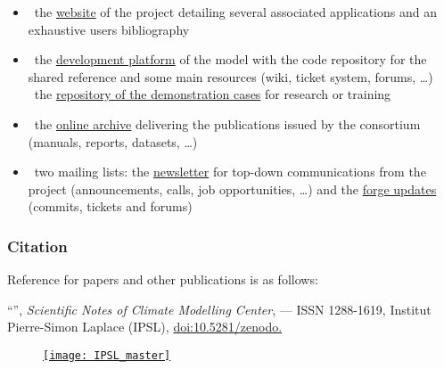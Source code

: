 \begin{itemize}
   \item \faWordpress\ the \href{http://www.nemo-ocean.eu}{website} of the project detailing
      several associated applications and an exhaustive users bibliography
   \item \faCodeFork\ the \href{https://forge.nemo-ocean.eu/nemo}{development platform} of
      the model with the code repository for the shared reference and some main resources
      (wiki, ticket system, forums, \ldots) \\
      \faGithub\ the \href{http://github.com/NEMO-ocean/NEMO-examples}
      {repository of the demonstration cases} for research or training
   \item \faCloudDownload\ the \href{http://zenodo.org/communities/nemo-ocean}{online archive}
      delivering the publications issued by the consortium (manuals, reports, datasets, \ldots)
   \item \faEnvelope\ two mailing lists:
      the \href{http://listes.ipsl.fr/sympa/info/nemo-newsletter}{newsletter} for
      top-down communications from the project (announcements, calls, job opportunities, \ldots)
      and the \href{http://listes.ipsl.fr/sympa/info/nemo-forge}{forge updates}
      (commits, tickets and forums)
\end{itemize}


\subsubsection*{Citation}

Reference for papers and other publications is as follows:

\medskip

\begin{sloppypar}
   ``{\bfseries \hdg}\ifdef{\shdg}{ -- \shdg}{}'',
   {\em Scientific Notes of Climate Modelling Center}, \textbf{\ipsl} --- ISSN 1288-1619,
   Institut Pierre-Simon Laplace (IPSL),
   \href{https://doi.org/10.5281/zenodo.\zid}{doi:10.5281/zenodo.\zid}
\end{sloppypar}

\begin{figure}[b]

   \begin{minipage}[c]{0.7\textwidth}
      \small
   \end{minipage}
   \hfill %
   \begin{minipage}[c]{0.25\textwidth}
      \href{http://www.cmc.ipsl.fr}{\texttt{[image: IPSL\_master]}}
   \end{minipage}

\end{figure}
